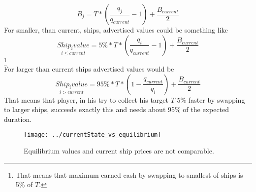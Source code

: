 \documentclass[]{article}
\begin{document}
\[
B_{j}=T*(\dfrac{q_{j}}{q_{current}}-1)+\dfrac{B_{current}}{2}
\]
For smaller, than current, ships, advertised values could be something like
\[\underset{i \leq current}{Ship_{i}value}=5\%*T*(\dfrac{q_{i}}{q_{current}}-1)+\dfrac{B_{current}}{2}
\]\footnote{That means that maximum earned cash by swapping to smallest of ships is 5\% of $T$.}\\
For larger than current ships advertised values would be
\[\underset{i > current}{Ship_{i}value}=95\%*T*(1-\dfrac{q_{current}}{q_{i}})+\dfrac{B_{current}}{2}\] 
That means that player, in his try to collect his target $T$ 5\% faster by swapping to larger ships, succeeds exactly this and needs about 95\% of the expected duration.
\begin{figure}[h]
	\centering
	\texttt{[image: ../currentState\_vs\_equilibrium]}
	\caption{Equilibrium values and current ship prices are not comparable.}
	\label{fig:currentstatevsequilibrium}
\end{figure}
\end{document}
